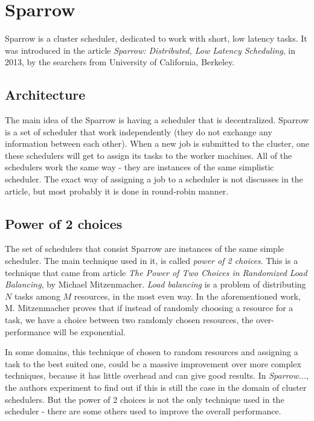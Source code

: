 \documentclass[11pt]{article}
\begin{document}
\section{Sparrow}

	Sparrow is a cluster scheduler, dedicated to work with short, low latency tasks. It was introduced in the article \textit{Sparrow: Distributed, Low Latency Scheduling}, in 2013, by the searchers from University of California, Berkeley.


	\subsection{Architecture}
    	\label{sparrowarchie}

		The main idea of the Sparrow is having a scheduler that is decentralized. Sparrow is a set of scheduler that work independently (they do not exchange any information between each other). When a new job is submitted to the cluster, one these schedulers will get to assign its tasks to the worker machines. All of the schedulers work the same way - they are instances of the same simplistic scheduler. The exact way of assigning a job to a scheduler is not discusses in the article, but most probably it is done in round-robin manner.


	\subsection{Power of 2 choices}

		The set of schedulers that consist Sparrow are instances of the same simple scheduler. The main technique used in it, is called \textit{power of 2 choices}. This is a technique that came from article \textit{The Power of Two Choices in Randomized Load Balancing}, by Michael Mitzenmacher. \textit{Load balancing} is a problem of distributing $N$ tasks among $M$ resources, in the most even way. In the aforementioned work, M. Mitzenmacher proves that if instead of randomly choosing a resource for a task, we have a choice between two randomly chosen resources, the over-performance will be exponential.

		In some domains, this technique of chosen to random resources and assigning a task to the best suited one, could be a massive improvement over more complex techniques, because it has little overhead and can give good results. In \textit{Sparrow...}, the authors experiment to find out if this is still the case in the domain of cluster schedulers. But the power of 2 choices is not the only technique used in the scheduler - there are some others used to improve the overall performance.
        
\end{document}
